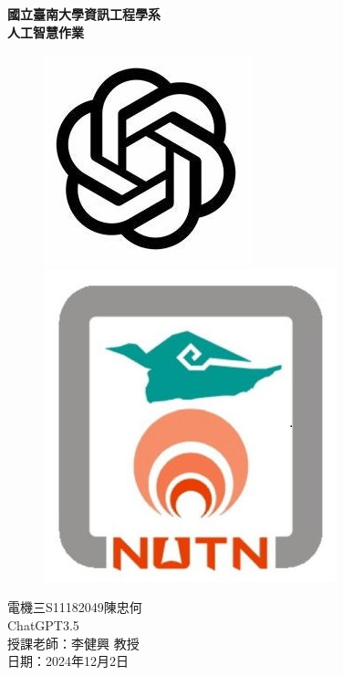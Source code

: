 \setmainfont{Times New Roman}  %
\begin{titlepage}
    \centering
    {\Huge \textbf{國立臺南大學資訊工程學系\\人工智慧作業}}\\[2cm] %
    \begin{figure}[htbp]
        \centering
        \includegraphics[width=0.3\linewidth]{images/chatgpt.jpg} 
        \hspace{2cm}
        \includegraphics[width=0.3\linewidth]{images/NUTN_LOGO.jpg}
    \end{figure} 
    \vspace{2cm}
    {\Large 電機三\hspace{1em}S11182049\hspace{1em}陳忠何}\\[0.5cm] 
    {\Large ChatGPT3.5}\\[0.5cm]
    \vfill
    {\Large 授課老師：李健興 教授}\\[1cm] %
    {\Large 日期：2024年12月2日}\\[2cm] %
\end{titlepage} 